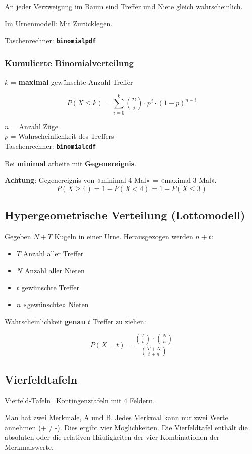 \begin{multicols}{2}
\begin{tcolorbox}[colback=white]
An jeder Verzweigung im Baum sind Treffer und Niete gleich
wahrscheinlich.

Im Urnenmodell: Mit Zurücklegen.

Taschenrechner:  \textbf{\texttt{binomialpdf}}
\end{tcolorbox}%
\forceCB%
\subsubsection*{Kumulierte Binomialverteilung}

\begin{tcolorbox}[colback=white]

$k$ = \textbf{maximal} gewünschte Anzahl Treffer


$$P(X\le k) = \sum_{i=0}^{k}{n \choose i}\cdot{}p^i\cdot{}(1-p)^{n-i}$$

$n$ = Anzahl Züge\\
$p$ = Wahrscheinlichkeit des Treffers\\
Taschenrechner: \textbf{\texttt{binomialcdf}}
\end{tcolorbox}


Bei \textbf{minimal} arbeite mit \textbf{Gegenereignis}.

\textbf{Achtung}: Gegenereignis von «minimal 4 Mal» = «maximal 3 Mal».
$$P(X \ge 4) = 1 - P(X < 4) = 1-P(X\le 3)$$


\subsection*{Hypergeometrische Verteilung (Lottomodell)}
Gegeben $N+T$ Kugeln in einer Urne. Herausgezogen werden $n+t$:
\begin{itemize}
\item $T$ Anzahl aller Treffer
\item $N$ Anzahl aller Nieten
\item $t$ gewünschte Treffer
\item $n$ «gewünschte» Nieten
\end{itemize}
Wahrscheinlichkeit \textbf{genau} $t$ Treffer zu ziehen:

$$P(X=t) = \frac{ {T \choose t} \cdot {N  \choose n} }{{T+N \choose t+n}}$$
%
\forceCB%

\subsection*{Vierfeldtafeln}
Vierfeld-Tafeln=Kontingenztafeln mit 4 Feldern.

Man hat zwei Merkmale, A und B. Jedes Merkmal kann nur zwei Werte
annehmen (+ / -). Dies ergibt vier Möglichkeiten. Die Vierfeldtafel
enthält die absoluten oder die relativen Häufigkeiten der vier
Kombinationen der Merkmalswerte.


\end{multicols}
